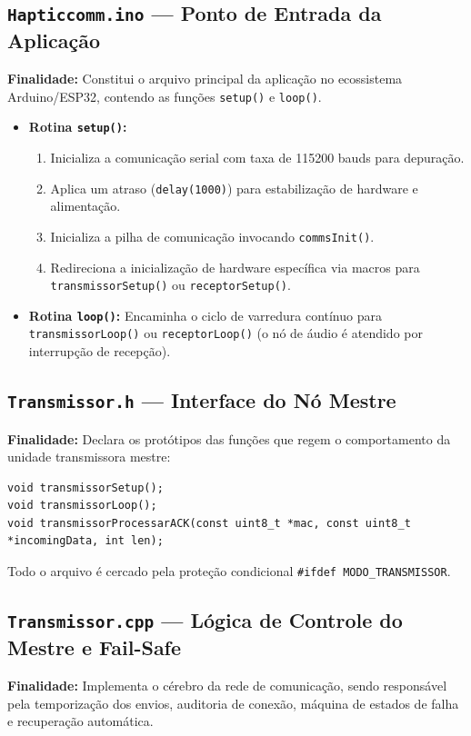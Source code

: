 \documentclass[12pt,a4paper]{article}
\begin{document}
\subsection{\texttt{Hapticcomm.ino} --- Ponto de Entrada da Aplicação}
\textbf{Finalidade:} Constitui o arquivo principal da aplicação no ecossistema Arduino/ESP32, contendo as funções \texttt{setup()} e \texttt{loop()}.

\begin{itemize}
    \item \textbf{Rotina \texttt{setup()}:}
    \begin{enumerate}
        \item Inicializa a comunicação serial com taxa de 115200 bauds para depuração.
        \item Aplica um atraso (\texttt{delay(1000)}) para estabilização de hardware e alimentação.
        \item Inicializa a pilha de comunicação invocando \texttt{commsInit()}.
        \item Redireciona a inicialização de hardware específica via macros para \texttt{transmissorSetup()} ou \texttt{receptorSetup()}.
    \end{enumerate}
    \item \textbf{Rotina \texttt{loop()}:} Encaminha o ciclo de varredura contínuo para \texttt{transmissorLoop()} ou \texttt{receptorLoop()} (o nó de áudio é atendido por interrupção de recepção).
\end{itemize}

\subsection{\texttt{Transmissor.h} --- Interface do Nó Mestre}
\textbf{Finalidade:} Declara os protótipos das funções que regem o comportamento da unidade transmissora mestre:
\begin{lstlisting}
void transmissorSetup();
void transmissorLoop();
void transmissorProcessarACK(const uint8_t *mac, const uint8_t *incomingData, int len);
\end{lstlisting}
Todo o arquivo é cercado pela proteção condicional \texttt{\#ifdef MODO\_TRANSMISSOR}.

\subsection{\texttt{Transmissor.cpp} --- Lógica de Controle do Mestre e Fail-Safe}
\textbf{Finalidade:} Implementa o cérebro da rede de comunicação, sendo responsável pela temporização dos envios, auditoria de conexão, máquina de estados de falha e recuperação automática.
\end{document}
